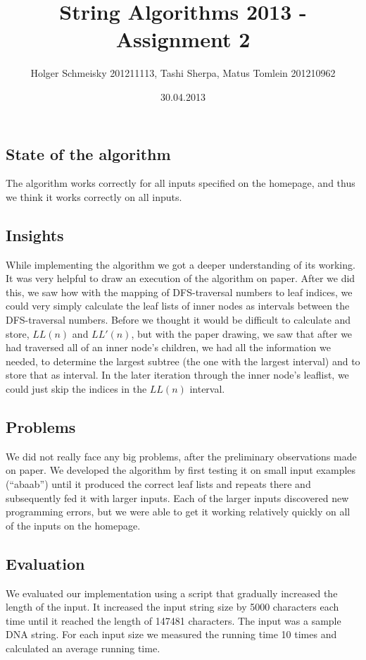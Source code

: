\documentclass[a4paper,10pt]{article}
\title{String Algorithms 2013 - Assignment 2}
\author{Holger Schmeisky  201211113, Tashi Sherpa, Matus Tomlein 201210962}
\date{30.04.2013}
\begin{document}
\maketitle

\subsection*{State of the algorithm}
The algorithm works correctly for all inputs specified on the homepage, and thus we think it works correctly on all inputs.

\subsection*{Insights}
While implementing the algorithm we got a deeper understanding of its working.\\ 
It was very helpful to draw an execution of the algorithm on paper. After we did this, we saw how with the mapping of DFS-traversal numbers to leaf indices, we could very simply calculate the leaf lists of inner nodes as intervals between the DFS-traversal numbers. Before we thought it would be difficult to calculate and store, $LL(n)$ and $LL'(n)$, but with the paper drawing, we saw that after we had traversed all of an inner node's children, we had all the information we needed, to determine the largest subtree (the one with the largest interval) and to store that as interval. In the later iteration through the inner node's leaflist, we could just skip the indices in the $LL(n)$ interval.

\subsection*{Problems}
We did not really face any big problems, after the preliminary observations made on paper. We developed the algorithm by first testing it on small input examples (``abaab'') until it produced the correct leaf lists and repeats there and subsequently fed it with larger inputs. Each of the larger inputs discovered new programming errors, but we were able to get it working relatively quickly on all of the inputs on the homepage.

\clearpage
\subsection*{Evaluation}
We evaluated our implementation using a script that gradually increased the
length of the input.
It increased the input string size by 5000 characters each time until it
reached the length of 147481 characters.
The input was a sample DNA string.
For each input size we measured the running time 10 times and calculated
an average running time.
\end{document}

